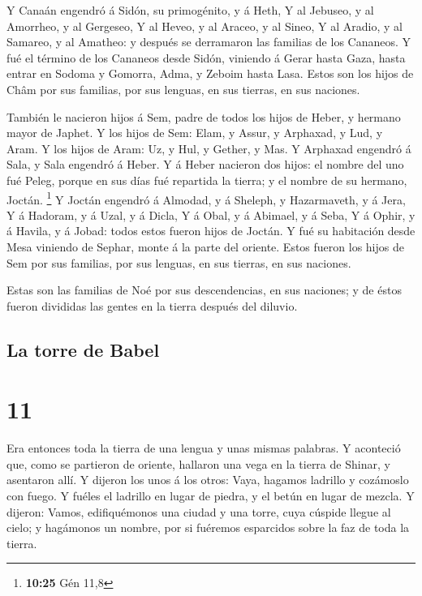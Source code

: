  Y Canaán engendró á Sidón, su primogénito, y á Heth,
 Y al Jebuseo, y al Amorrheo, y al Gergeseo,
 Y al Heveo, y al Araceo, y al Sineo,  Y
al Aradio, y al Samareo, y al Amatheo: y después se derramaron las
familias de los Cananeos.  Y fué el término de los
Cananeos desde Sidón, viniendo á Gerar hasta Gaza, hasta entrar en
Sodoma y Gomorra, Adma, y Zeboim hasta Lasa.  Estos son
los hijos de Châm por sus familias, por sus lenguas, en sus tierras, en
sus naciones.

 También le nacieron hijos á Sem, padre de todos los
hijos de Heber, y hermano mayor de Japhet.  Y los hijos
de Sem: Elam, y Assur, y Arphaxad, y Lud, y Aram.  Y los
hijos de Aram: Uz, y Hul, y Gether, y Mas.  Y Arphaxad
engendró á Sala, y Sala engendró á Heber.  Y á Heber
nacieron dos hijos: el nombre del uno fué Peleg, porque en sus días fué
repartida la tierra; y el nombre de su hermano, Joctán. \footnote{\textbf{10:25}
  Gén 11,8}  Y Joctán engendró á Almodad, y á Sheleph, y
Hazarmaveth, y á Jera,  Y á Hadoram, y á Uzal, y á Dicla,
 Y á Obal, y á Abimael, y á Seba,  Y á
Ophir, y á Havila, y á Jobad: todos estos fueron hijos de Joctán.
 Y fué su habitación desde Mesa viniendo de Sephar, monte
á la parte del oriente.  Estos fueron los hijos de Sem
por sus familias, por sus lenguas, en sus tierras, en sus naciones.

 Estas son las familias de Noé por sus descendencias, en
sus naciones; y de éstos fueron divididas las gentes en la tierra
después del diluvio.

\hypertarget{la-torre-de-babel}{%
\subsection{La torre de Babel}\label{la-torre-de-babel}}

\hypertarget{section-10}{%
\section{11}\label{section-10}}

 Era entonces toda la tierra de una lengua y unas mismas
palabras.  Y aconteció que, como se partieron de oriente,
hallaron una vega en la tierra de Shinar, y asentaron allí.
 Y dijeron los unos á los otros: Vaya, hagamos ladrillo y
cozámoslo con fuego. Y fuéles el ladrillo en lugar de piedra, y el betún
en lugar de mezcla.  Y dijeron: Vamos, edifiquémonos una
ciudad y una torre, cuya cúspide llegue al cielo; y hagámonos un nombre,
por si fuéremos esparcidos sobre la faz de toda la tierra.


